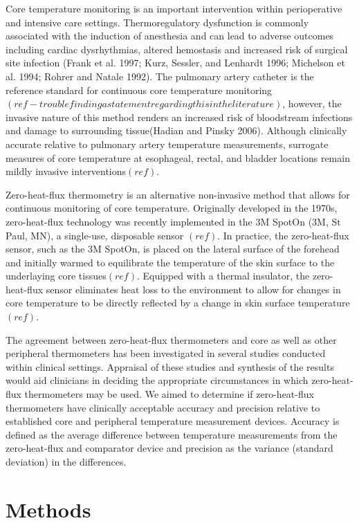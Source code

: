 \documentclass[smallextended]{svjour3}       %
\begin{document}
Core temperature monitoring is an important intervention within
perioperative and intensive care settings. Thermoregulatory dysfunction
is commonly associated with the induction of anesthesia and can lead to
adverse outcomes including cardiac dysrhythmias, altered hemostasis and
increased risk of surgical site infection (Frank et al. 1997; Kurz,
Sessler, and Lenhardt 1996; Michelson et al. 1994; Rohrer and Natale
1992). The pulmonary artery catheter is the reference standard for
continuous core temperature
monitoring\((ref - trouble finding a statement regarding this in the literature)\),
however, the invasive nature of this method renders an increased risk of
bloodstream infections and damage to surrounding tissue(Hadian and
Pinsky 2006). Although clinically accurate relative to pulmonary artery
temperature measurements, surrogate measures of core temperature at
esophageal, rectal, and bladder locations remain mildly invasive
interventions\((ref)\).

Zero-heat-flux thermometry is an alternative non-invasive method that
allows for continuous monitoring of core temperature. Originally
developed in the 1970s, zero-heat-flux technology was recently
implemented in the 3M SpotOn (3M, St Paul, MN), a single-use, disposable
sensor \((ref)\). In practice, the zero-heat-flux sensor, such as the 3M
SpotOn, is placed on the lateral surface of the forehead and initially
warmed to equilibrate the temperature of the skin surface to the
underlaying core tissues\((ref)\). Equipped with a thermal insulator,
the zero-heat-flux sensor eliminates heat loss to the environment to
allow for changes in core temperature to be directly reflected by a
change in skin surface temperature \((ref)\).

The agreement between zero-heat-flux thermometers and core as well as
other peripheral thermometers has been investigated in several studies
conducted within clinical settings. Appraisal of these studies and
synthesis of the results would aid clinicians in deciding the
appropriate circumstances in which zero-heat-flux thermometers may be
used. We aimed to determine if zero-heat-flux thermometers have
clinically acceptable accuracy and precision relative to established
core and peripheral temperature measurement devices. Accuracy is defined
as the average difference between temperature measurements from the
zero-heat-flux and comparator device and precision as the variance
(standard deviation) in the differences.

\hypertarget{methods}{%
\section{Methods}\label{methods}}
\end{document}
